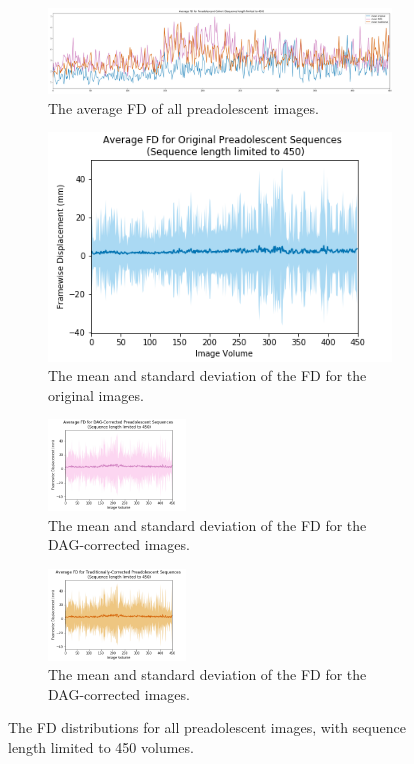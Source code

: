\begin{figure}[ht]
	\centering
	\begin{subfigure}{0.9\textwidth}
		\centering
		\includegraphics[width=1.0\textwidth]{6/figures/pread_fd_all_450_avg.png}
		\caption{The average FD of all preadolescent images.}
	\end{subfigure}

	\begin{subfigure}{0.9\textwidth}
		\centering
		\includegraphics[width=.4\textwidth]{6/figures/pread-bold-fd-450.png}
		\caption{The mean and standard deviation of the FD for the original images.}
	\end{subfigure}
	
	\begin{subfigure}{0.9\textwidth}
		\centering
		\includegraphics[width=0.4\textwidth]{6/figures/pread-dag-fd-450.png}
		\caption{The mean and standard deviation of the FD for the DAG-corrected images.}
	\end{subfigure}
	
	\begin{subfigure}{0.9\textwidth}
		\centering
		\includegraphics[width=0.4\textwidth]{6/figures/pread-trad-fd-450.png}
		\caption{The mean and standard deviation of the FD for the DAG-corrected images.}
	\end{subfigure}
\caption{The FD distributions for all preadolescent images, with sequence length limited to 450 volumes.}
\label{fig:pread-fd-450}
\end{figure}

